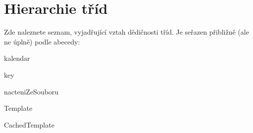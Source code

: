 \section{Hierarchie tříd}
Zde naleznete seznam, vyjadřující vztah dědičnosti tříd. Je seřazen přibližně (ale ne úplně) podle abecedy:\begin{DoxyCompactList}
\item kalendar{\ttfamily  [external]}\item key{\ttfamily  [external]}\item nacteniZeSouboru{\ttfamily  [external]}\item Template{\ttfamily  [external]}\begin{DoxyCompactList}
\item CachedTemplate{\ttfamily  [external]}\end{DoxyCompactList}
\end{DoxyCompactList}
